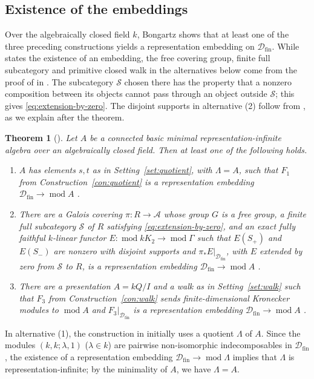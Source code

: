 \documentclass[a4paper,reqno,10pt]{amsart}
\newtheorem{theorem}{Theorem}[section]
\theoremstyle{definition}
\DeclareMathOperator{\md}{mod}
\newcommand{\D}{\mathcal D}
\numberwithin{equation}{section}
\begin{document}
\subsection{Existence of the embeddings}
\label{sec:finite-input}
Over the algebraically closed field $k$, Bongartz \cite[Theorem~6 and its proof]{Bongartz} shows that at least one
of the three preceding constructions yields a representation embedding on
$\D_{\mathrm{fin}}$. While \cite[Theorem~6]{Bongartz} states the existence of an embedding, the free covering group,
finite full subcategory and primitive closed walk in the alternatives
below come from the proof of \cite[Theorem~7]{Bongartz} in \cite[\S5.4]{Bongartz}.
The subcategory $\mathcal S$ chosen there has the property that a nonzero
composition between its objects cannot pass through an object outside
$\mathcal S$; this gives \eqref{eq:extension-by-zero}.
The disjoint supports in alternative (2) follow from
\cite[Lemma~5]{Bongartz}, as we explain after the theorem.

\begin{theorem}[{\cite[Theorem~6 and its proof]{Bongartz}}]
\label{thm:finite-input}
Let $A$ be a connected basic minimal representation-infinite algebra
over an algebraically closed field. Then at least one of the following
holds.
\begin{enumerate}
\item $A$ has elements $s,t$ as in Setting~\ref{set:quotient}, with
$\Lambda=A$, such that $F_1$ from Construction~\ref{con:quotient} is a
representation embedding $\D_{\mathrm{fin}}\to\md A$
\cite[Theorem~1 and Corollary~2]{Bongartz}.
\item There are a Galois covering $\pi:R\to\mathcal A$ whose group
$G$ is a free group, a finite full subcategory $\mathcal S$ of $R$
satisfying \eqref{eq:extension-by-zero}, and
an exact fully faithful $k$-linear functor $E:\md kK_2\to\md\Gamma$
such that $E(S_+)$ and $E(S_-)$ are nonzero with disjoint supports and
$\pi_*E|_{\D_{\mathrm{fin}}}$, with $E$ extended by zero from
$\mathcal S$ to $R$, is a representation embedding
$\D_{\mathrm{fin}}\to\md A$
\cite[Theorem~3, Lemma~5, and proof of Theorem~7]{Bongartz}.
\item There are a presentation $A=kQ/I$ and a walk as in
Setting~\ref{set:walk} such that $F_3$ from Construction~\ref{con:walk}
sends finite-dimensional Kronecker modules to $\md A$ and
$F_3|_{\D_{\mathrm{fin}}}$ is a
representation embedding $\D_{\mathrm{fin}}\to\md A$
\cite[proof of Theorem~7]{Bongartz}.
\end{enumerate}
\end{theorem}
In alternative (1), the construction in \cite[Corollary~2]{Bongartz}
initially uses a quotient $\Lambda$ of $A$. Since the modules $(k,k;\lambda,1)$
($\lambda\in k$) are pairwise non-isomorphic indecomposables in
$\D_{\mathrm{fin}}$, the existence of a representation embedding $\D_{\mathrm{fin}}\to\md\Lambda$
implies that $\Lambda$ is representation-infinite; by the minimality of $A$, we have $\Lambda=A$.
\end{document}
